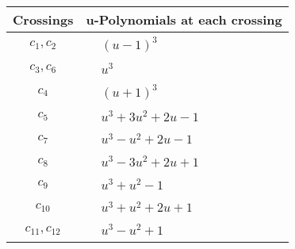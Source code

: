 \documentclass[1p]{elsarticle_modified}
\theoremstyle{definition}
\begin{document}
\begin{tabular}{m{50pt}|m{274pt}}
Crossings & \hspace{64pt}u-Polynomials at each crossing \\
\hline $$\begin{aligned}c_{1},c_{2}\end{aligned}$$&$\begin{aligned}
&(u-1)^3
\end{aligned}$\\
\hline $$\begin{aligned}c_{3},c_{6}\end{aligned}$$&$\begin{aligned}
&u^3
\end{aligned}$\\
\hline $$\begin{aligned}c_{4}\end{aligned}$$&$\begin{aligned}
&(u+1)^3
\end{aligned}$\\
\hline $$\begin{aligned}c_{5}\end{aligned}$$&$\begin{aligned}
&u^3+3 u^2+2 u-1
\end{aligned}$\\
\hline $$\begin{aligned}c_{7}\end{aligned}$$&$\begin{aligned}
&u^3- u^2+2 u-1
\end{aligned}$\\
\hline $$\begin{aligned}c_{8}\end{aligned}$$&$\begin{aligned}
&u^3-3 u^2+2 u+1
\end{aligned}$\\
\hline $$\begin{aligned}c_{9}\end{aligned}$$&$\begin{aligned}
&u^3+u^2-1
\end{aligned}$\\
\hline $$\begin{aligned}c_{10}\end{aligned}$$&$\begin{aligned}
&u^3+u^2+2 u+1
\end{aligned}$\\
\hline $$\begin{aligned}c_{11},c_{12}\end{aligned}$$&$\begin{aligned}
&u^3- u^2+1
\end{aligned}$\\
\hline
\end{tabular}\\~\\
\end{document}
